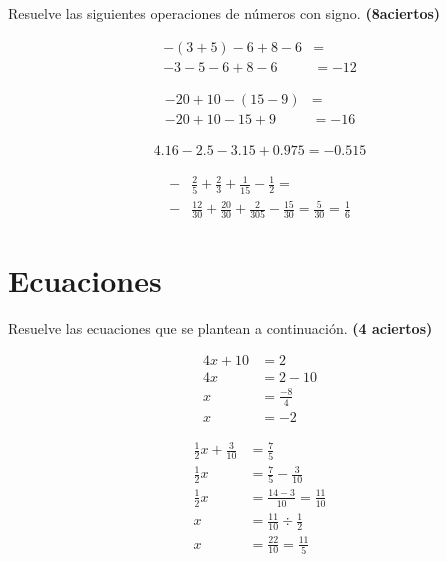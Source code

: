 \documentclass[11pt]{article}
\begin{document}
\vspace{5mm}
Resuelve las siguientes operaciones de n\'umeros con signo. 
\hfill \textbf{(8aciertos)}
\begin{multicols}{2}

\begin{align}
-(3 +5) -6 +8 -6 &= \\
-3-5-6+8-6 &= -12 \nonumber
\end{align}

\vspace{2cm}
\begin{align}
-20 +10 -(15 -9) &= \\
-20 +10 -15 +9 &= -16 \nonumber
\end{align}

\vspace{2cm}
\begin{align}
4.16 -2.5 -3.15 + 0.975 = -0.515
\end{align}

\vspace{2cm}
\begin{align}
-& \frac{2}{5} + \frac{2}{3} + \frac{1}{15} - \frac{1}{2} =  \\
-& \frac{12}{30} + \frac{20}{30} + \frac{2}{305} - \frac{15}{30} = \frac{5}{30} = \frac{1}{6} \nonumber
\end{align}

\vspace{2cm}

\end{multicols}

\newpage

\setcounter{equation}{0}
\section{Ecuaciones}

Resuelve las ecuaciones que se plantean a continuaci\'on. \hfill \textbf{(4 aciertos)}

\begin{multicols}{2}
\noindent
\begin{align}
4x + 10 &= 2 \\
4x &= 2-10 \nonumber \\
x &= \frac{-8}{4}  \nonumber \\
x &= -2 \nonumber
\end{align}

\vfill

\vspace{3cm}
\noindent
\begin{align}
\frac{1}{2} x + \frac{3}{10} &= \frac{7}{5} \\
\frac{1}{2} x &= \frac{7}{5} - \frac{3}{10} \nonumber \\
\frac{1}{2} x &= \frac{14-3}{10} = \frac{11}{10} \nonumber \\
x &= \frac{11}{10} \div \frac{1}{2} \nonumber \\
x &= \frac{22}{10} = \frac{11}{5} \nonumber
\end{align}

\vspace{3cm}

\end{multicols}
\end{document}
